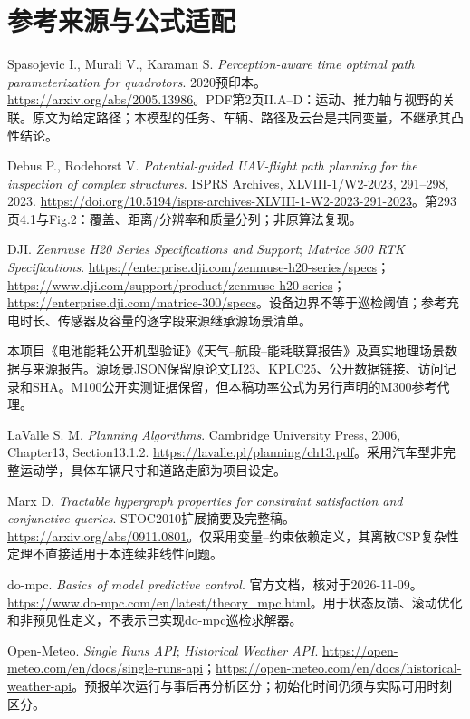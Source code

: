 \section{参考来源与公式适配}
\noindent [R1] Spasojevic I., Murali V., Karaman S. \emph{Perception-aware time optimal path parameterization for quadrotors}. 2020预印本。\url{https://arxiv.org/abs/2005.13986}。PDF第2页II.A--D：运动、推力轴与视野的关联。原文为给定路径；本模型的任务、车辆、路径及云台是共同变量，不继承其凸性结论。

\noindent [R2] Debus P., Rodehorst V. \emph{Potential-guided UAV-flight path planning for the inspection of complex structures}. ISPRS Archives, XLVIII-1/W2-2023, 291--298, 2023. \url{https://doi.org/10.5194/isprs-archives-XLVIII-1-W2-2023-291-2023}。第293页4.1与Fig.2：覆盖、距离/分辨率和质量分列；非原算法复现。

\noindent [R3] DJI. \emph{Zenmuse H20 Series Specifications and Support}; \emph{Matrice 300 RTK Specifications}. \url{https://enterprise.dji.com/zenmuse-h20-series/specs}；\url{https://www.dji.com/support/product/zenmuse-h20-series}；\url{https://enterprise.dji.com/matrice-300/specs}。设备边界不等于巡检阈值；参考充电时长、传感器及容量的逐字段来源继承源场景清单。

\noindent [R4] 本项目《电池能耗公开机型验证》《天气--航段--能耗联算报告》及真实地理场景数据与来源报告。源场景JSON保留原论文LI23、KPLC25、公开数据链接、访问记录和SHA。M100公开实测证据保留，但本稿功率公式为另行声明的M300参考代理。

\noindent [R5] LaValle S. M. \emph{Planning Algorithms}. Cambridge University Press, 2006, Chapter13, Section13.1.2. \url{https://lavalle.pl/planning/ch13.pdf}。采用汽车型非完整运动学，具体车辆尺寸和道路走廊为项目设定。

\noindent [R6] Marx D. \emph{Tractable hypergraph properties for constraint satisfaction and conjunctive queries}. STOC2010扩展摘要及完整稿。\url{https://arxiv.org/abs/0911.0801}。仅采用变量--约束依赖定义，其离散CSP复杂性定理不直接适用于本连续非线性问题。

\noindent [R7] do-mpc. \emph{Basics of model predictive control}. 官方文档，核对于2026-11-09。\url{https://www.do-mpc.com/en/latest/theory_mpc.html}。用于状态反馈、滚动优化和非预见性定义，不表示已实现do-mpc巡检求解器。

\noindent [R8] Open-Meteo. \emph{Single Runs API}; \emph{Historical Weather API}. \url{https://open-meteo.com/en/docs/single-runs-api}；\url{https://open-meteo.com/en/docs/historical-weather-api}。预报单次运行与事后再分析区分；初始化时间仍须与实际可用时刻区分。

